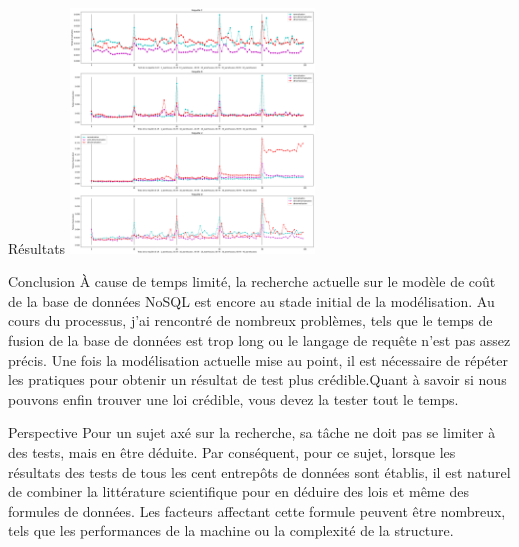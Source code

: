 \documentclass[xcolor=dvipsnames]{beamer}
\begin{document}
\begin{frame}{Résultats}
		\includegraphics[height = 6.5cm]{images/image_2.png}
\end{frame}

\begin{frame}{Conclusion}
À cause de temps limité, la recherche actuelle sur le modèle de coût de la base de données NoSQL est encore au stade initial de la modélisation.  Au cours du processus, j'ai rencontré de nombreux problèmes, tels que le temps de fusion de la base de données est trop long ou le langage de requête n'est pas assez précis. Une fois la modélisation actuelle mise au point, il est nécessaire de répéter les pratiques pour obtenir un résultat de test plus crédible.Quant à savoir si nous pouvons enfin trouver une loi crédible, vous devez la tester tout le temps.
\end{frame}

\begin{frame}{Perspective}
Pour un sujet axé sur la recherche, sa tâche ne doit pas se limiter à des tests, mais en être déduite. Par conséquent, pour ce sujet, lorsque les résultats des tests de tous les cent entrepôts de données sont établis, il est naturel de combiner la littérature scientifique pour en déduire des lois et même des formules de données. Les facteurs affectant cette formule peuvent être nombreux, tels que les performances de la machine ou la complexité de la structure.
\end{frame}
\end{document}
